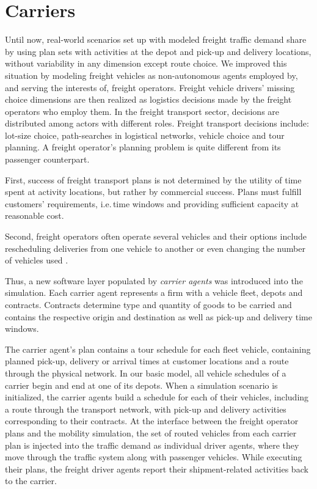 \section{Carriers}
\label{sec:carriers}
Until now, real-world scenarios set up with  modeled freight traffic demand share by using plan sets with activities at the depot and pick-up and delivery locations, without variability in any dimension except route choice. We improved this situation by modeling freight vehicles as non-autonomous agents employed by, and serving the interests of, freight operators. Freight vehicle drivers' missing choice dimensions are then realized as logistics decisions made by the freight operators who employ them. In the freight transport sector, decisions are distributed among actors with different roles. Freight transport decisions include: lot-size choice, path-searches in logistical networks, vehicle choice and tour planning. A freight operator's planning problem is quite different from its passenger counterpart.

First, success of freight transport plans is not determined by the utility of time
spent at activity locations, but rather by commercial success. Plans must fulfill
customers' requirements, i.e.\,time windows and providing sufficient capacity at
reasonable cost.

Second, freight operators often operate several vehicles and their
options include rescheduling deliveries from one vehicle to another or even changing the
number of vehicles used .

Thus, a new software layer populated by \emph{carrier agents} was introduced into the
simulation. Each carrier agent represents a firm with a vehicle fleet, depots and contracts.
Contracts determine type and quantity of goods to be carried and contains the respective 
origin and destination as well as pick-up and delivery time windows.

The carrier agent's plan contains a tour schedule  for each fleet  vehicle, containing 
planned pick-up, delivery or arrival times at customer locations and a route through 
the physical network. In our basic model, all vehicle schedules of a carrier begin and end at one of its depots.
When a simulation scenario is initialized, the carrier agents build a schedule for each of their vehicles, 
including a route through the transport network, with pick-up and delivery activities corresponding to their contracts.
At the interface between the freight operator plans and the mobility simulation, the set of routed vehicles 
from each carrier plan is injected into the traffic demand as individual driver agents, where they move 
through the traffic system along with passenger vehicles. While executing their plans, the freight driver 
agents report their shipment-related activities back to the carrier.

